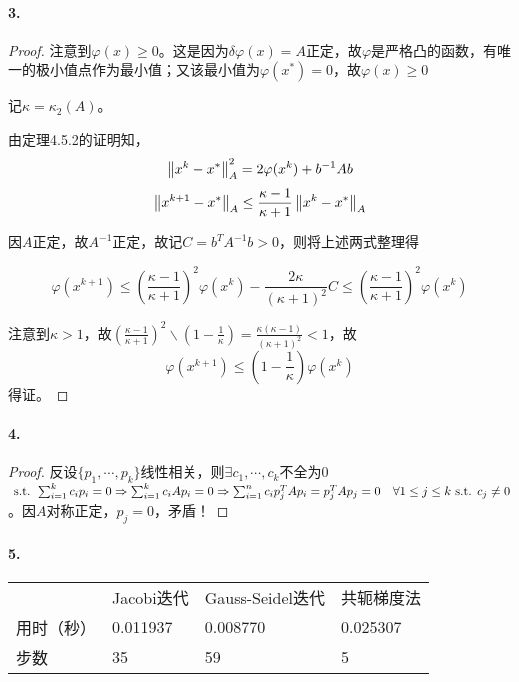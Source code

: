\documentclass{ctexart}
\begin{document}
\paragraph{3.}
\begin{proof}
注意到$\varphi(x)\geq 0$。这是因为$\delta\varphi(x)=A$正定，故$\varphi$是严格凸的函数，有唯一的极小值点作为最小值；又该最小值为$\varphi(x^*)=0$，故$\varphi(x)\geq 0$

记$\kappa=\kappa_2(A)$。

由定理4.5.2的证明知，
\[\left\|x^k-x^*\right\|_A^2=2\varphi(x^k)+b^{-1}Ab\]
\[\left\|x^{k+1}-x^*\right\|_A\leq\frac{\kappa-1}{\kappa+1}\left\|x^k-x^*\right\|_A\]

因$A$正定，故$A^{-1}$正定，故记$C=b^TA^{-1}b>0$，则将上述两式整理得

\[\varphi(x^{k+1})\leq(\frac{\kappa-1}{\kappa+1})^2\varphi(x^{k})-\frac{2\kappa}{(\kappa+1)^2}C\leq(\frac{\kappa-1}{\kappa+1})^2\varphi(x^{k})\]

注意到$\kappa>1$，故$(\frac{\kappa-1}{\kappa+1})^2\backslash (1-\frac{1}{\kappa})=\frac{\kappa(\kappa-1)}{(\kappa+1)^2}<1$，故
\[\varphi(x^{k+1})\leq(1-\frac{1}{\kappa})\varphi(x^k)\]
得证。
\end{proof}


\paragraph{4.}
\begin{proof}
反设$\{p_1,\cdots,p_k\}$线性相关，则$\exists c_1,\cdots ,c_k$不全为0$\text{ s.t. } \sum_{i=1}^k c_ip_i=0\Rightarrow \sum_{i=1}^k c_iAp_i=0\Rightarrow \sum_{i=1}^n c_ip_j^TAp_i=p_j^TAp_j=0\quad \forall 1\leq j\leq k \text{ s.t. } c_j\neq 0$。因$A$对称正定，$p_j=0$，矛盾！

\end{proof}

\paragraph{5.}
\begin{tabular}{llll}
      & Jacobi迭代 & Gauss-Seidel迭代 & 共轭梯度法    \\
用时（秒） & 0.011937 & 0.008770       & 0.025307 \\
步数    & 35       & 59             & 5       
\end{tabular}
\end{document}

